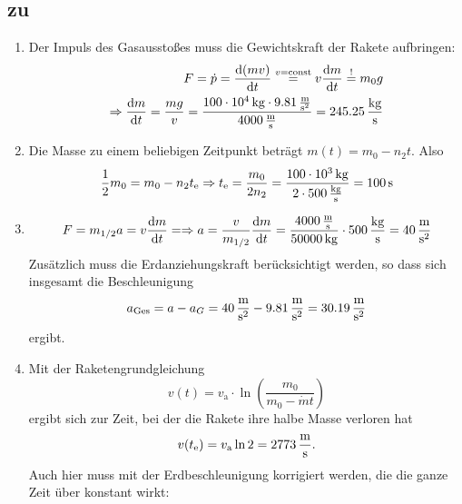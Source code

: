 \documentclass[a4paper]{scrartcl}
\begin{document}
\subsection{zu }
\label{lsg:Raketenstart}
\begin{enumerate}[noitemsep]
\item Der Impuls des Gasausstoßes muss die Gewichtskraft der Rakete aufbringen:
    \begin{align*}
      F = \dot p = \frac{\text{d}(mv)}{\text{d}t} \stackrel{v=\text{const}}{=} v \frac{\text{d}m}{\text{d}t} \stackrel{!}{=} m_0g \\
      \Rightarrow \frac{\text{d}m}{\text{d}t} = \frac{mg}{v} = \frac{\unit[100 \cdot 10^4]{kg} \cdot \unit[9.81]{\frac{m}{s^2}}}{\unit[4000]{\frac{m}{s}}} = \unit[245.25]{\frac{kg}{s}}
  \end{align*}
\item Die Masse zu einem beliebigen Zeitpunkt beträgt $m(t) = m_0 - n_2t$. Also
  \begin{equation*}
    \frac{1}{2} m_0 = m_0 -n_2t_\text{e} \Rightarrow t_\text{e} = \frac{m_0}{2n_2} = \frac{\unit[100 \cdot 10^3]{kg}}{2 \cdot \unit[500]{\frac{kg}{s}}} = \unit[100]{s}
  \end{equation*}
\item
  \begin{equation*}
    F = m_{1/2}a = v \frac{\text{d}m}{\text{d}t} = \Rightarrow a = \frac{v}{m_{1/2}} \frac{\text{d}m}{\text{d}t} = \frac{\unit[4000]{\frac{m}{s}}}{\unit[50000]{kg}} \cdot \unit[500]{\frac{kg}{s}} = \unit[40]{\frac{m}{s^2}}
  \end{equation*}
  Zusätzlich muss die Erdanziehungskraft berücksichtigt werden, so dass sich insgesamt die Beschleunigung
  \begin{equation*}
    a_\text{Ges} = a - a_{G} = \unit[40]{\frac{m}{s^2}} - \unit[9.81]{\frac{m}{s^2}} = \unit[30.19]{\frac{m}{s^2}}
  \end{equation*}
  ergibt.
\item Mit der Raketengrundgleichung 
  \begin{equation*}
    v(t) =  v_\text{a} \cdot \ln \left(   \frac{m_0}{m_0 - \dot mt}\right)
  \end{equation*}
  ergibt sich zur Zeit, bei der die Rakete ihre halbe Masse verloren hat
  \begin{equation*}
    v(t_\text{e}) = v_\text{a} \ln 2 = \unit[2773]{\frac{m}{s}}.
  \end{equation*}
  Auch hier muss mit der Erdbeschleunigung korrigiert werden, die die ganze Zeit über konstant wirkt:

\end{enumerate}
\end{document}
